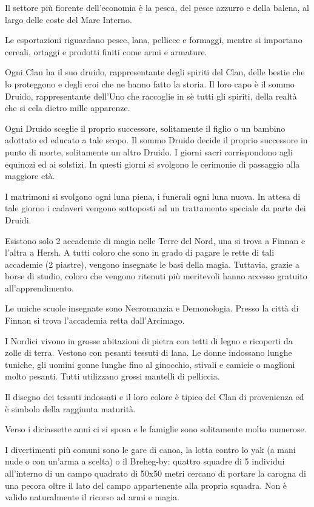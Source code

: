 Il settore pi\`u fiorente dell'economia \`e la pesca, del pesce
azzurro e della balena, al largo delle coste del Mare Interno.

Le esportazioni riguardano pesce, lana, pellicce e formaggi, mentre si
importano cereali, ortaggi e prodotti finiti come armi e armature.

\Religione Ogni Clan ha
il suo druido, rappresentante degli spiriti del Clan, delle bestie che
lo proteggono e degli eroi che ne hanno fatto la storia. Il loro capo
\`e il sommo Druido, rappresentante dell'Uno che raccoglie in s\`e
tutti gli spiriti, della realt\`a che si cela dietro mille
apparenze. 

Ogni Druido sceglie il proprio successore, solitamente il figlio o un
bambino adottato ed educato a tale scopo. Il sommo Druido decide il
proprio successore in punto di morte, solitamente un altro Druido. I
giorni sacri corrispondono agli equinozi ed ai solstizi. In questi
giorni si svolgono le cerimonie di passaggio alla maggiore et\`a.

I matrimoni si svolgono ogni luna piena, i funerali ogni luna nuova.
In attesa di tale giorno i cadaveri vengono sottoposti ad un
trattamento speciale da parte dei Druidi.

\Magia Esistono solo 2 accademie
di magia nelle Terre del Nord, una si trova a Finnan e l'altra a
Hersh. A tutti coloro che sono in grado di pagare le rette di tali
accademie (2 piastre), vengono insegnate le basi della magia. Tuttavia,
grazie a borse di studio, coloro che vengono ritenuti pi\`u
meritevoli hanno accesso gratuito all'apprendimento. 

Le uniche scuole
insegnate sono Necromanzia e Demonologia. Presso la citt\`a di
Finnan si trova l'accademia retta dall'Arcimago.

\Moda I Nordici vivono in grosse abitazioni di pietra con tetti di legno e ricoperti
da zolle di terra.  Vestono con pesanti tessuti di lana. Le donne
indossano lunghe tuniche, gli uomini gonne lunghe fino al ginocchio,
stivali e camicie o maglioni molto pesanti.  Tutti utilizzano grossi
mantelli di pelliccia. 

Il disegno dei tessuti indossati e il loro colore \`e tipico del
Clan di provenienza ed \`e simbolo della raggiunta maturit\`a.

Verso i diciassette anni ci si sposa e le famiglie sono solitamente
molto numerose.

I divertimenti pi\`u comuni sono le gare di canoa, la lotta contro
lo yak (a mani nude o con un'arma a scelta) o il Breheg-by: quattro
squadre di 5 individui all'interno di un campo quadrato di 50x50
metri cercano di portare la carogna di una pecora oltre il lato del
campo appartenente alla propria squadra. Non \`e valido naturalmente
il ricorso ad armi e magia.

